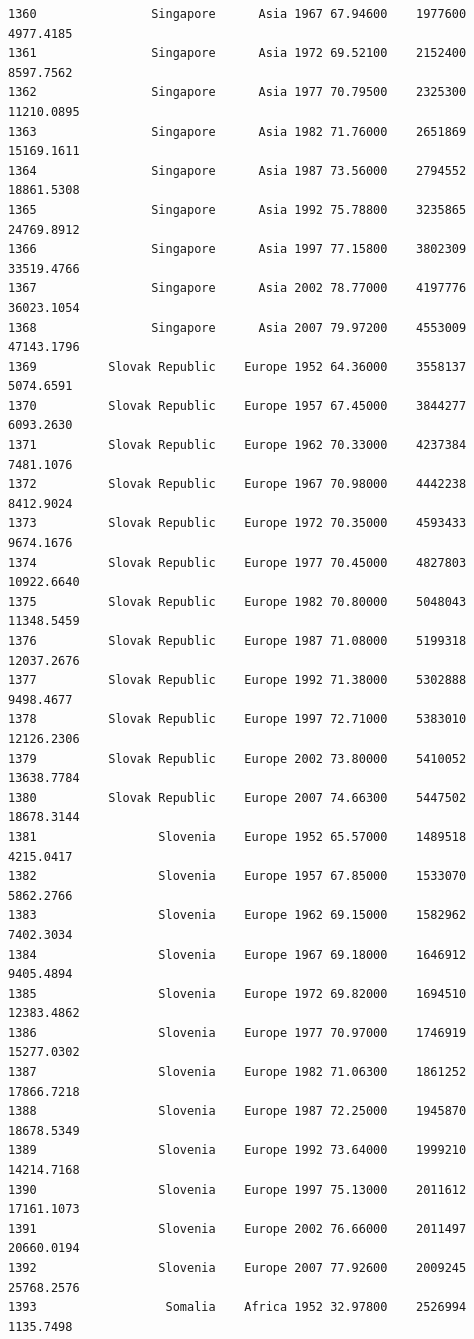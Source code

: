 \documentclass[
  letterpaper,
  DIV=11,
  numbers=noendperiod]{scrreprt}
\begin{document}
\begin{verbatim}
1360                Singapore      Asia 1967 67.94600    1977600   4977.4185
1361                Singapore      Asia 1972 69.52100    2152400   8597.7562
1362                Singapore      Asia 1977 70.79500    2325300  11210.0895
1363                Singapore      Asia 1982 71.76000    2651869  15169.1611
1364                Singapore      Asia 1987 73.56000    2794552  18861.5308
1365                Singapore      Asia 1992 75.78800    3235865  24769.8912
1366                Singapore      Asia 1997 77.15800    3802309  33519.4766
1367                Singapore      Asia 2002 78.77000    4197776  36023.1054
1368                Singapore      Asia 2007 79.97200    4553009  47143.1796
1369          Slovak Republic    Europe 1952 64.36000    3558137   5074.6591
1370          Slovak Republic    Europe 1957 67.45000    3844277   6093.2630
1371          Slovak Republic    Europe 1962 70.33000    4237384   7481.1076
1372          Slovak Republic    Europe 1967 70.98000    4442238   8412.9024
1373          Slovak Republic    Europe 1972 70.35000    4593433   9674.1676
1374          Slovak Republic    Europe 1977 70.45000    4827803  10922.6640
1375          Slovak Republic    Europe 1982 70.80000    5048043  11348.5459
1376          Slovak Republic    Europe 1987 71.08000    5199318  12037.2676
1377          Slovak Republic    Europe 1992 71.38000    5302888   9498.4677
1378          Slovak Republic    Europe 1997 72.71000    5383010  12126.2306
1379          Slovak Republic    Europe 2002 73.80000    5410052  13638.7784
1380          Slovak Republic    Europe 2007 74.66300    5447502  18678.3144
1381                 Slovenia    Europe 1952 65.57000    1489518   4215.0417
1382                 Slovenia    Europe 1957 67.85000    1533070   5862.2766
1383                 Slovenia    Europe 1962 69.15000    1582962   7402.3034
1384                 Slovenia    Europe 1967 69.18000    1646912   9405.4894
1385                 Slovenia    Europe 1972 69.82000    1694510  12383.4862
1386                 Slovenia    Europe 1977 70.97000    1746919  15277.0302
1387                 Slovenia    Europe 1982 71.06300    1861252  17866.7218
1388                 Slovenia    Europe 1987 72.25000    1945870  18678.5349
1389                 Slovenia    Europe 1992 73.64000    1999210  14214.7168
1390                 Slovenia    Europe 1997 75.13000    2011612  17161.1073
1391                 Slovenia    Europe 2002 76.66000    2011497  20660.0194
1392                 Slovenia    Europe 2007 77.92600    2009245  25768.2576
1393                  Somalia    Africa 1952 32.97800    2526994   1135.7498

\end{verbatim}
\end{document}
